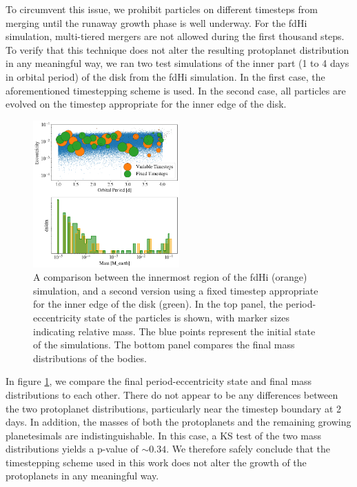 \documentclass[twocolumn,linenumbers]{aastex63}
\begin{document}
To circumvent this issue, we prohibit particles on different timesteps from merging until the runaway growth phase is well underway. For the fdHi simulation, multi-tiered mergers are not allowed during the first thousand steps. To verify that this technique does not alter the resulting protoplanet distribution in any meaningful way, we ran two test simulations of the inner part (1 to 4 days in orbital period) of the disk from the fdHi simulation. In the first case, the aforementioned timestepping scheme is used. In the second case, all particles are evolved on the timestep appropriate for the inner edge of the disk.

\begin{figure}
\begin{center}
    \includegraphics[width=0.5\textwidth]{figures/rung_ecc.png}
    \caption{A comparison between the innermost region of the fdHi (orange) simulation, and a second version using a fixed timestep appropriate for the inner edge of the disk (green). In the top panel, the period-eccentricity state of the particles is shown, with marker sizes indicating relative mass. The blue points represent the initial state of the simulations. The bottom panel compares the final mass distributions of the bodies.\label{fig:rung_ecc}}
\end{center}
\end{figure}

In figure \ref{fig:rung_ecc}, we compare the final period-eccentricity state and final mass distributions to each other. There do not appear to be any differences between the two protoplanet distributions, particularly near the timestep boundary at 2 days. In addition, the masses of both the protoplanets and the remaining growing planetesimals are indistinguishable. In this case, a KS test of the two mass distributions yields a p-value of $\sim 0.34$. We therefore safely conclude that the timestepping scheme used in this work does not alter the growth of the protoplanets in any meaningful way.



\clearpage
\end{document}
